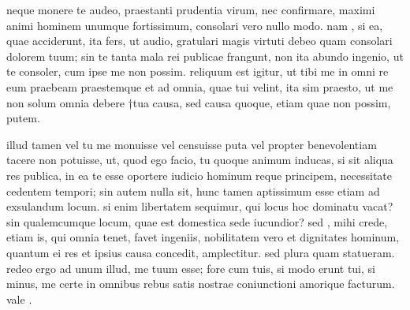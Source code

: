 


 neque monere te audeo, praestanti prudentia virum, nec confirmare, maximi animi hominem unumque fortissimum, consolari vero nullo modo. nam , si ea, quae acciderunt, ita fers, ut audio, gratulari magis virtuti debeo quam consolari dolorem tuum; sin te tanta mala rei publicae frangunt, non ita abundo ingenio, ut te consoler, cum ipse me non possim. reliquum est igitur, ut tibi me in omni re eum praebeam praestemque et ad omnia, quae tui velint, ita sim praesto, ut me non solum omnia debere †tua causa, sed causa quoque, etiam quae non possim, putem.

 illud tamen vel tu me monuisse vel censuisse puta vel propter benevolentiam tacere non potuisse, ut, quod ego facio, tu quoque animum inducas, si sit aliqua res publica, in ea te esse oportere iudicio hominum reque principem, necessitate cedentem tempori; sin autem nulla sit, hunc tamen aptissimum esse etiam ad exsulandum locum. si enim libertatem sequimur, qui locus hoc dominatu vacat? sin qualemcumque locum, quae est domestica sede iucundior? sed , mihi crede, etiam is, qui omnia tenet, favet ingeniis, nobilitatem vero et dignitates hominum, quantum ei res et ipsius causa concedit, amplectitur. sed plura quam statueram. redeo ergo ad unum illud, me tuum esse; fore cum tuis, si modo erunt tui, si minus, me certe in omnibus rebus satis nostrae coniunctioni amorique facturum. vale .
